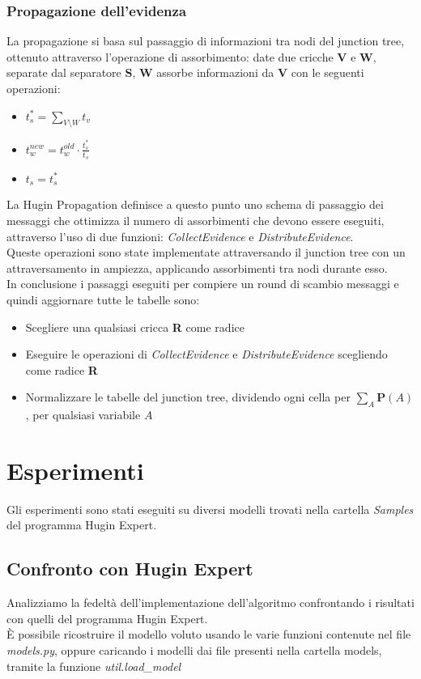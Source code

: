 \documentclass[a4paper]{article}
\begin{document}
\subsubsection{Propagazione dell'evidenza}
La propagazione si basa sul passaggio di informazioni tra nodi del junction tree, ottenuto attraverso l'operazione di assorbimento: date due cricche \textbf{V} e \textbf{W}, separate dal separatore \textbf{S}, \textbf{W} assorbe informazioni da \textbf{V} con le seguenti operazioni:
\begin{itemize}
\item $t_s^* = \sum_{V\setminus W}t_v$
\item $t_w^{new}=t_w^{old}\cdot\frac{t_s^*}{t_s}$
\item $t_s = t_s^*$
\end{itemize} 
La Hugin Propagation definisce a questo punto uno schema di passaggio dei messaggi che ottimizza il numero di assorbimenti che devono essere eseguiti, attraverso l'uso di due funzioni: \emph{CollectEvidence} e \emph{DistributeEvidence}.\\
Queste operazioni sono state implementate attraversando il junction tree con un attraversamento in ampiezza, applicando assorbimenti tra nodi durante esso.\\
In conclusione i passaggi eseguiti per compiere un round di scambio messaggi e quindi aggiornare tutte le tabelle sono:
\begin{itemize}
\item Scegliere una qualsiasi cricca \textbf{R} come radice
\item Eseguire le operazioni di \emph{CollectEvidence} e \emph{DistributeEvidence} scegliendo come radice \textbf{R}
\item Normalizzare le tabelle del junction tree, dividendo ogni cella per $\sum_A \mathbf{P}(A)$, per qualsiasi variabile $A$
\end{itemize}

\section{Esperimenti}
Gli esperimenti sono stati eseguiti su diversi modelli trovati nella cartella \emph{Samples} del programma Hugin Expert.
\subsection{Confronto con Hugin Expert}
Analizziamo la fedeltà dell'implementazione dell'algoritmo confrontando i risultati con quelli del programma Hugin Expert.\\
È possibile ricostruire il modello voluto usando le varie funzioni contenute nel file \emph{models.py}, oppure caricando i modelli dai file presenti nella cartella models, tramite la funzione \emph{util.load\_model}
\end{document}
